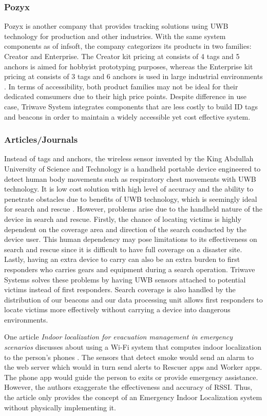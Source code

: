 \subsubsection{Pozyx}
Pozyx is another company that provides tracking solutions using UWB technology for production and other industries. With the same system 
components as of infsoft, the company categorizes its products in two families: Creator and Enterprise. The Creator kit pricing at 
 consists of 4 tags and 5 anchors is aimed for hobbyist prototyping purposes, whereas the Enterprise kit pricing at  
consists of 3 tags and 6 anchors is used in large industrial environments \cite{R3-7}. In terms of accessibility, both product families may 
not be ideal for their dedicated comsumers due to their high price points. Despite difference in use case, Triwave System integrates 
components that are less costly to build ID tags and beacons in order to maintain a widely accessible yet cost effective system. 

\subsubsection{Articles/Journals}
Instead of tags and anchors, the wireless sensor invented by the King Abdullah University of Science and Technology is a handheld portable 
device engineered to detect human body movements such as respiratory chest movements with UWB technology. It is low cost solution with high 
level of accuracy and the ability to penetrate obstacles due to benefits of UWB technology, which is seemingly ideal for search and rescue 
\cite{R3-8}. However, problems arise due to the handheld nature of the device in search and rescue. Firstly, the chance of locating victims
is highly dependent on the coverage area and direction of the search conducted by the device user. This human dependency may pose limitations 
to its effectiveness on search and rescue since it is difficult to have full coverage on a disaster site. Lastly, having an extra device to 
carry can also be an extra burden to first responders who carries gears and equipment during a search operation. Triwave Systems solves these 
problems by having UWB sensors attached to potential victims instead of first responders. Search coverage is also handled by the distribution 
of our beacons and our data processing unit allows first responders to locate victims more effectively without carrying a device into dangerous 
environments.

\bigskip
One article \textit{Indoor localization for evacuation management in emergency scenarios} discusses about using a Wi-Fi system that computes 
indoor localization to the person’s phones \cite{R3-9}. The sensors that detect smoke would send an alarm to the web server which would in turn 
send alerts to Rescuer apps and Worker apps. The phone app would guide the person to exits or provide emergency assistance. However, the authors 
exaggerate the effectiveness and accuracy of RSSI. Thus, the article only provides the concept of an Emergency Indoor Localization system without 
physically implementing it. 
